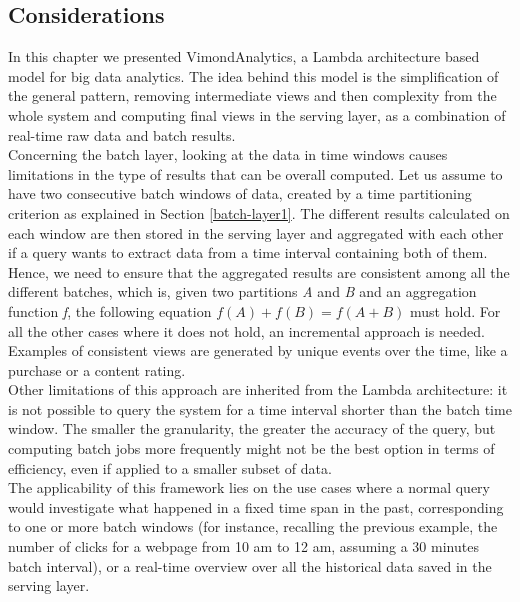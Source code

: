 \subsection{Considerations}
\label{chap3:consideration}
In this chapter we presented VimondAnalytics, a Lambda architecture based model for big data analytics. The idea behind this model is the simplification of the general pattern, removing intermediate views and then complexity from the whole system and computing final views in the serving layer, as a combination of real-time raw data and batch results.\\
Concerning the batch layer, looking at the data in time windows causes limitations in the type of results that can be overall computed. Let us assume to have two consecutive batch windows of data, created by a time partitioning criterion as explained in Section \ref{batch-layer1}. The different results calculated on each window are then stored in the serving layer and aggregated with each other if a query wants to extract data from a time interval containing both of them. Hence, we need to ensure that the aggregated results are consistent among all the different batches, which is, given two partitions \textit{A} and \textit{B} and an aggregation function \textit{f}, the following equation $f(A) + f(B) = f(A+B)$ must hold. For all the other cases where it does not hold, an incremental approach is needed. Examples of consistent views are generated by unique events over the time, like a purchase or a content rating. \\
Other limitations of this approach are inherited from the Lambda architecture: it is not possible to query the system for a time interval shorter than the batch time window. The smaller the granularity, the greater the accuracy of the query, but computing batch jobs more frequently might not be the best option in terms of efficiency, even if applied to a smaller subset of data.\\
The applicability of this framework lies on the use cases where a normal query would investigate what happened in a fixed time span in the past, corresponding to one or more batch windows (for instance, recalling the previous example, the number of clicks for a webpage from 10 am to 12 am, assuming a 30 minutes batch interval), or a real-time overview over all the historical data saved in the serving layer.